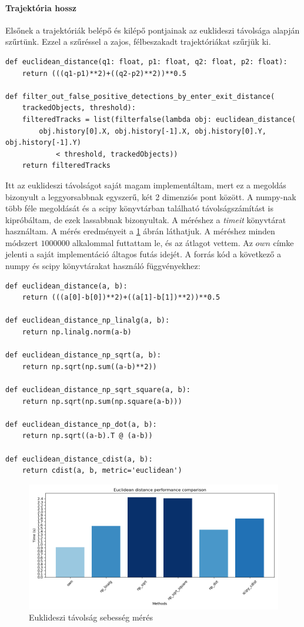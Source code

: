 \documentclass[12pt,a4paper]{article}
\begin{document}
\paragraph{Trajektória hossz} Elsőnek a trajektóriák belépő és kilépő pontjainak az euklideszi távolsága alapján szűrtünk. Ezzel a szűréssel a zajos, félbeszakadt trajektóriákat szűrjük ki.
\begin{verbatim}
def euclidean_distance(q1: float, p1: float, q2: float, p2: float):
    return (((q1-p1)**2)+((q2-p2)**2))**0.5

def filter_out_false_positive_detections_by_enter_exit_distance(
    trackedObjects, threshold):
    filteredTracks = list(filterfalse(lambda obj: euclidean_distance(
        obj.history[0].X, obj.history[-1].X, obj.history[0].Y, obj.history[-1].Y) 
            < threshold, trackedObjects))
    return filteredTracks
\end{verbatim}
Itt az euklideszi távolságot saját magam implementáltam, mert ez a megoldás bizonyult a leggyorsabbnak egyszerű, két 2 dimenziós pont között.
A numpy-nak több féle megoldását és a scipy könyvtárban található távolságszámítást is kipróbáltam, de ezek lassabbnak bizonyultak.
A méréshez a \textit{timeit} könyvtárat használtam. A mérés eredményeit a \ref{fig:EuclideanDistance} ábrán láthatjuk. A méréshez minden módszert $1000000$ alkalommal futtattam le, és az átlagot vettem.
Az $own$ címke jelenti a saját implementáció áltagos futás idejét.
A forrás kód a következő a numpy és scipy könyvtárakat használó függvényekhez:
\newpage
\begin{verbatim}
def euclidean_distance(a, b):
    return (((a[0]-b[0])**2)+((a[1]-b[1])**2))**0.5

def euclidean_distance_np_linalg(a, b):
    return np.linalg.norm(a-b)

def euclidean_distance_np_sqrt(a, b):
    return np.sqrt(np.sum((a-b)**2))

def euclidean_distance_np_sqrt_square(a, b):
    return np.sqrt(np.sum(np.square(a-b)))

def euclidean_distance_np_dot(a, b):
    return np.sqrt((a-b).T @ (a-b))

def euclidean_distance_cdist(a, b):
    return cdist(a, b, metric='euclidean')    
\end{verbatim}

\begin{figure}[H]
    \includegraphics[width=1\columnwidth]{euclidean_distance_performance.png}
    \caption{Euklideszi távolság sebesség mérés}
    \label{fig:EuclideanDistance}
\end{figure}
\end{document}
